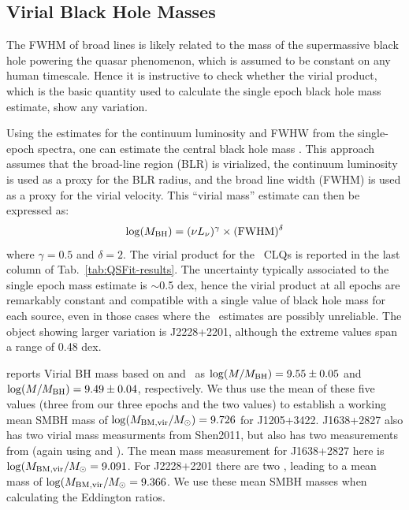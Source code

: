 \documentclass[fleqn,usenatbib]{mnras}
\begin{document}
\subsection{Virial Black Hole Masses}\label{sec:BH_masses} 
The FWHM of broad lines is likely related to the mass of the
supermassive black hole powering the quasar phenomenon, which is
assumed to be constant on any human timescale.  Hence it is
instructive to check whether the virial product, which is the basic
quantity used to calculate the single epoch black hole mass estimate,
show any variation.

Using the estimates for the continuum luminosity and FWHW from the
single-epoch spectra, one can estimate the central black hole mass
\citep[e.g.][]{Shen2011, Calderone2017}.  This approach assumes that
the broad-line region (BLR) is virialized, the continuum luminosity is
used as a proxy for the BLR radius, and the broad line width (FWHM) is
used as a proxy for the virial velocity.  This ``virial mass''
estimate can then be expressed as:
\begin{equation}
  \log(M_{\rm BH}) = (\nu L_{\nu})^{\gamma} \times ({\rm FWHM})^{\delta}
\end{equation}
where $\gamma=0.5$ and $\delta=2$.  The virial product for the \civ\
CLQs is reported in the last column of Tab.~\ref{tab:QSFit-results}. 
The uncertainty typically associated to the single epoch mass estimate
is $\sim$0.5 dex, hence the virial product at all epochs are
remarkably constant and compatible with a single value of black hole
mass for each source, even in those cases where the \civ\ estimates
are possibly unreliable. The object showing larger variation is
J2228+2201, although the extreme values span a range of 0.48 dex.

\citet{Shen2011} reports Virial BH mass based on \mgii and \civ\ as
$\log (M/M_{\rm BH}) = 9.55\pm0.05$ and $\log(M/M_{\rm BH}) =
9.49\pm0.04$, respectively. We thus use the mean of these five values
(three from our three epochs and the two \citet{Shen2011} values) to
establish a working mean SMBH mass of $\log (M_{\rm BM, vir}/M_{\odot})
= 9.726$ for J1205+3422.  J1638+2827 also has two virial mass
measurments from Shen2011, but also has two measurements from
\citet{Kozlowski2017} (again using \civ and \mgii). The mean mass
measurement for J1638+2827 here is $\log(M_{\rm BM, vir}/M_{\odot} =
9.091$. For J2228+2201 there are two \citet{Kozlowski2017}, leading to
a mean mass of $\log(M_{\rm BM, vir}/M_{\odot} = 9.366$. We use these
mean SMBH masses when calculating the Eddington ratios.
\end{document}
